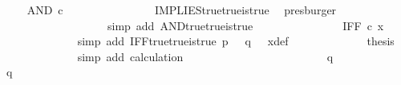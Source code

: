 \begin{isabellebody}
\ \isamarkupfalse%
\ {\isachardoublequoteopen}{\isachardot}{\kern0pt}{\isachardot}{\kern0pt}{\isachardot}{\kern0pt}\ {\isacharequal}{\kern0pt}\ AND\ {\isasymcirc}\isactrlsub c\ {\isasymlangle}{\isasymt}{\isacharcomma}{\kern0pt}\ {\isasymt}{\isasymrangle}{\isachardoublequoteclose}\isanewline
\ \ \ \ \ \ \ \ \ \ \ \ \isamarkupfalse%
\ IMPLIES{\isacharunderscore}{\kern0pt}true{\isacharunderscore}{\kern0pt}true{\isacharunderscore}{\kern0pt}is{\isacharunderscore}{\kern0pt}true\ \isamarkupfalse%
\ presburger\isanewline
\ \ \ \ \ \ \ \ \ \ \isamarkupfalse%
\ \isamarkupfalse%
\ {\isachardoublequoteopen}{\isachardot}{\kern0pt}{\isachardot}{\kern0pt}{\isachardot}{\kern0pt}\ {\isacharequal}{\kern0pt}\ {\isasymt}{\isachardoublequoteclose}\isanewline
\ \ \ \ \ \ \ \ \ \ \ \ \isamarkupfalse%
\ {\isacharparenleft}{\kern0pt}simp\ add{\isacharcolon}{\kern0pt}\ AND{\isacharunderscore}{\kern0pt}true{\isacharunderscore}{\kern0pt}true{\isacharunderscore}{\kern0pt}is{\isacharunderscore}{\kern0pt}true{\isacharparenright}{\kern0pt}\isanewline
\ \ \ \ \ \ \ \ \ \ \isamarkupfalse%
\ \isamarkupfalse%
\ {\isachardoublequoteopen}{\isachardot}{\kern0pt}{\isachardot}{\kern0pt}{\isachardot}{\kern0pt}\ {\isacharequal}{\kern0pt}\ IFF\ {\isasymcirc}\isactrlsub c\ x{\isachardoublequoteclose}\isanewline
\ \ \ \ \ \ \ \ \ \ \ \ \isamarkupfalse%
\ {\isacharparenleft}{\kern0pt}simp\ add{\isacharcolon}{\kern0pt}\ IFF{\isacharunderscore}{\kern0pt}true{\isacharunderscore}{\kern0pt}true{\isacharunderscore}{\kern0pt}is{\isacharunderscore}{\kern0pt}true\ {\isacartoucheopen}p\ {\isacharequal}{\kern0pt}\ {\isasymt}{\isacartoucheclose}\ {\isacartoucheopen}q\ {\isacharequal}{\kern0pt}\ {\isasymt}{\isacartoucheclose}\ x{\isacharunderscore}{\kern0pt}def{\isacharparenright}{\kern0pt}\isanewline
\ \ \ \ \ \ \ \ \ \ \isamarkupfalse%
\ \isamarkupfalse%
\ {\isacharquery}{\kern0pt}thesis\isanewline
\ \ \ \ \ \ \ \ \ \ \ \ \isamarkupfalse%
\ {\isacharparenleft}{\kern0pt}simp\ add{\isacharcolon}{\kern0pt}\ calculation{\isacharparenright}{\kern0pt}\isanewline
\ \ \ \ \ \ \ \ \isamarkupfalse%
\isanewline
\ \ \ \ \ \ \isamarkupfalse%
\isanewline
\ \ \ \ \ \ \ \ \isamarkupfalse%
\ {\isachardoublequoteopen}q\ {\isasymnoteq}\ {\isasymt}{\isachardoublequoteclose}\isanewline
\ \ \ \ \ \ \ \ \isamarkupfalse%
\ \isamarkupfalse%
\ {\isachardoublequoteopen}q\ {\isacharequal}{\kern0pt}\ {\isasymf}{\isachardoublequoteclose}\isanewline

\end{isabellebody}
